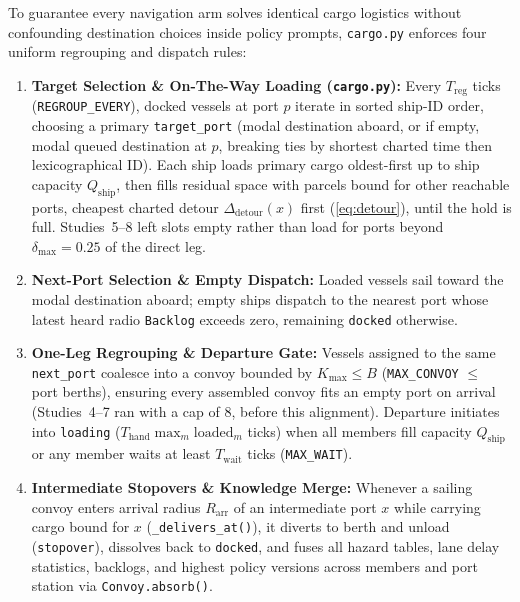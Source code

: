 \documentclass[11pt,a4paper,oneside]{report}
\begin{document}
To guarantee every navigation arm solves identical cargo logistics without confounding destination choices inside policy prompts, \texttt{cargo.py} enforces four uniform regrouping and dispatch rules:
\begin{enumerate}
    \item \textbf{Target Selection \& On-The-Way Loading (\texttt{cargo.py}):} Every $T_{\text{reg}}$ ticks (\texttt{REGROUP\_EVERY}), docked vessels at port $p$ iterate in sorted ship-ID order, choosing a primary \texttt{target\_port} (modal destination aboard, or if empty, modal queued destination at $p$, breaking ties by shortest charted time then lexicographical ID). Each ship loads primary cargo oldest-first up to ship capacity $Q_{\text{ship}}$, then fills residual space with parcels bound for other reachable ports, cheapest charted detour $\Delta_{\text{detour}}(x)$ first (\autoref{eq:detour}), until the hold is full. Studies~5--8 left slots empty rather than load for ports beyond $\delta_{\max}=0.25$ of the direct leg.
    \item \textbf{Next-Port Selection \& Empty Dispatch:} Loaded vessels sail toward the modal destination aboard; empty ships dispatch to the nearest port whose latest heard radio \texttt{Backlog} exceeds zero, remaining \texttt{docked} otherwise.
    \item \textbf{One-Leg Regrouping \& Departure Gate:} Vessels assigned to the same \texttt{next\_port} coalesce into a convoy bounded by $K_{\max} \le B$ (\texttt{MAX\_CONVOY} $\le$ port berths), ensuring every assembled convoy fits an empty port on arrival (Studies~4--7 ran with a cap of $8$, before this alignment). Departure initiates into \texttt{loading} ($T_{\text{hand}} \max_m \text{loaded}_m$ ticks) when all members fill capacity $Q_{\text{ship}}$ or any member waits at least $T_{\text{wait}}$ ticks (\texttt{MAX\_WAIT}).
    \item \textbf{Intermediate Stopovers \& Knowledge Merge:} Whenever a sailing convoy enters arrival radius $R_{\text{arr}}$ of an intermediate port $x$ while carrying cargo bound for $x$ (\texttt{\_delivers\_at()}), it diverts to berth and unload (\texttt{stopover}), dissolves back to \texttt{docked}, and fuses all hazard tables, lane delay statistics, backlogs, and highest policy versions across members and port station via \texttt{Convoy.absorb()}.
\end{enumerate}
\end{document}
